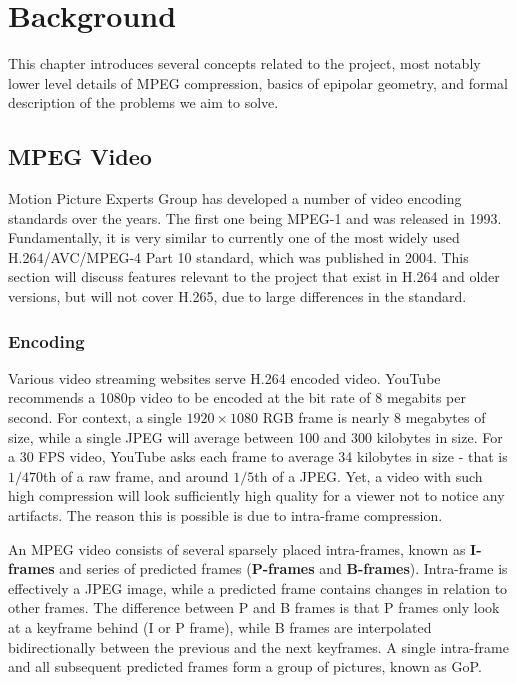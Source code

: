 \documentclass[11pt,english]{report}
\begin{document}
\chapter{Background}

This chapter introduces several concepts related to the project, most notably lower level details of MPEG compression, basics of epipolar geometry, and formal description of the problems we aim to solve.

\section{MPEG Video}

Motion Picture Experts Group has developed a number of video encoding standards over the years. The first one being MPEG-1 and was released in 1993. Fundamentally, it is very similar to currently one of the most widely used H.264/AVC/MPEG-4 Part 10 standard, which was published in 2004. This section will discuss features relevant to the project that exist in H.264 and older versions, but will not cover H.265, due to large differences in the standard.

\subsection{Encoding}

Various video streaming websites serve H.264 encoded video. YouTube recommends a 1080p video to be encoded at the bit rate of 8 megabits per second\cite{youtube}. For context, a single $1920 \times 1080$ RGB frame is nearly 8 megabytes of size, while a single JPEG will average between 100 and 300 kilobytes in size. For a 30 FPS video, YouTube asks each frame to average 34 kilobytes in size - that is $1/470$th of a raw frame, and around $1/5$th of a JPEG. Yet, a video with such high compression will look sufficiently high quality for a viewer not to notice any artifacts. The reason this is possible is due to intra-frame compression.

An MPEG video consists of several sparsely placed intra-frames, known as \textbf{I-frames} and series of predicted frames (\textbf{P-frames} and \textbf{B-frames}). Intra-frame is effectively a JPEG image, while a predicted frame contains changes in relation to other frames. The difference between P and B frames is that P frames only look at a keyframe behind (I or P frame), while B frames are interpolated bidirectionally between the previous and the next keyframes. A single intra-frame and all subsequent predicted frames form a group of pictures, known as GoP.
\end{document}
